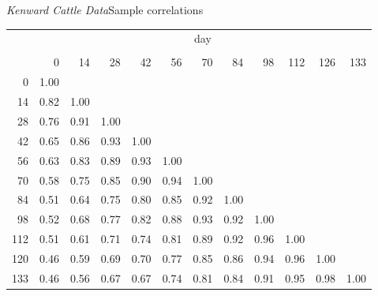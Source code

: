 \begin{frame}[c]{\textit{Kenward Cattle Data}}{Sample correlations}
\begin{center}
\scriptsize
\begin{tabular}{r|rrrrrrrrrrr}
& \multicolumn{11}{c}{day}\\
&&&&&&&&&&\\
& 0 & 14 & 28 & 42 & 56 & 70 & 84 & 98& 112& 126 &133\\
  \hline\noalign{\smallskip} 
0 & 1.00  \\ 
  14 & 0.82 & 1.00  \\ 
  28 & 0.76 & 0.91 & 1.00 & \\ 
  42 & 0.65 & 0.86 & 0.93 & 1.00 &  \\ 
  56 & 0.63 & 0.83 & 0.89 & 0.93 & 1.00 &  \\ 
  70 & 0.58 & 0.75 & 0.85 & 0.90 & 0.94 & 1.00 & \\ 
  84 & 0.51 & 0.64 & 0.75 & 0.80 & 0.85 & 0.92 & 1.00 &\\ 
  98 & 0.52 & 0.68 & 0.77 & 0.82 & 0.88 & 0.93 & 0.92 & 1.00 & \\ 
  112 & 0.51 & 0.61 & 0.71 & 0.74 & 0.81 & 0.89 & 0.92 & 0.96 & 1.00 & \\ 
  120 & 0.46 & 0.59 & 0.69 & 0.70 & 0.77 & 0.85 & 0.86 & 0.94 & 0.96 & 1.00 &  \\ 
  133 & 0.46 & 0.56 & 0.67 & 0.67 & 0.74 & 0.81 & 0.84 & 0.91 & 0.95 & 0.98 & 1.00 \\ 
   \hline
\end{tabular}
\end{center}
\end{frame}


